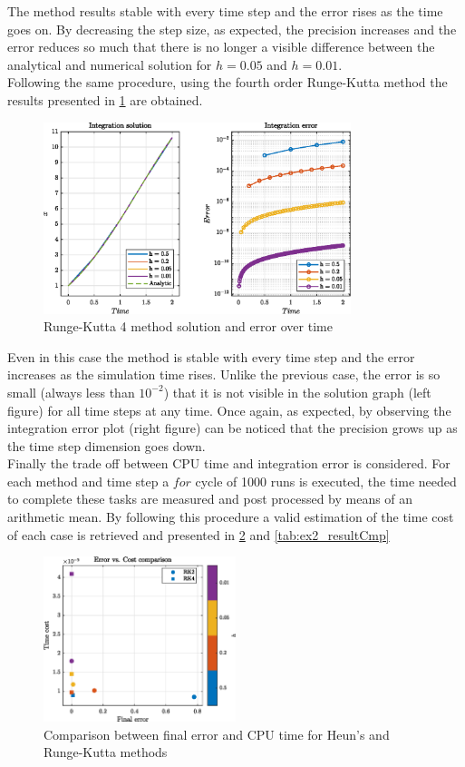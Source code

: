 \documentclass[11pt,a4paper,oneside]{article}
\begin{document}
The method results stable with every time step and the error rises as the time goes on.
By decreasing the step size, as expected, the precision increases and the error reduces so much that there is no longer a visible difference between the analytical and numerical solution for $h=0.05$ and $h=0.01$.  
\\
Following the same procedure, using the fourth order Runge-Kutta method the results presented in \cref{fig:ex2_rk4} are obtained.

\begin{figure}[htb]
    \centering
    \includegraphics*[width=0.8\textwidth, keepaspectratio]{ex2_rk4.eps}
    \caption[]{\label{fig:ex2_rk4} Runge-Kutta 4 method solution and error over time}
\end{figure}

Even in this case the method is stable with every time step and the error increases as the simulation time rises.
Unlike the previous case, the error is so small (always less than $10^{-2}$) that it is not visible in the solution graph (left figure) for all time steps at any time.
Once again, as expected, by observing the integration error plot (right figure) can be noticed that the precision grows up as the time step dimension goes down. 
\\
Finally the trade off between CPU time and integration error is considered. For each method and time step a $for$ cycle of 1000 runs is executed, the time needed to complete these tasks are measured and post processed by means of an arithmetic mean.
By following this procedure a valid estimation of the time cost of each case is retrieved and presented in \cref{fig:ex2_error} and \cref{tab:ex2_resultCmp}

\begin{figure}[htb]
    \centering
    \includegraphics*[width=0.5\textwidth, keepaspectratio]{ex2_error.eps}
    \caption[]{\label{fig:ex2_error} Comparison between final error and CPU time for Heun's and Runge-Kutta methods}
\end{figure}
\end{document}
